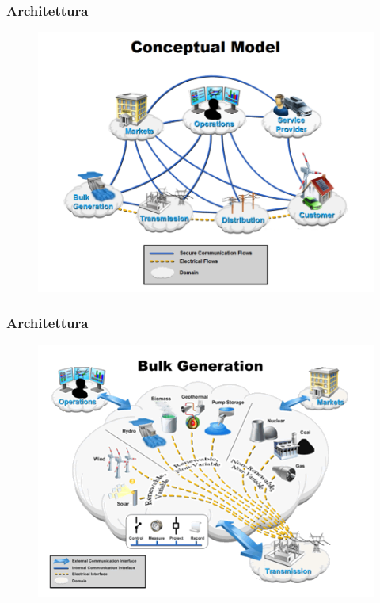 \begin{frame}[fragile]
  \frametitle{Architettura}
	\begin{figure}[h] 
		\includegraphics[scale=0.6]{imgs/sg.png}
	\end{figure}
\end{frame}

\begin{frame}[fragile]
  \frametitle{Architettura}
	\begin{figure}[h] 
		\includegraphics[scale=0.6]{imgs/gen.png}
	\end{figure}
\end{frame}

